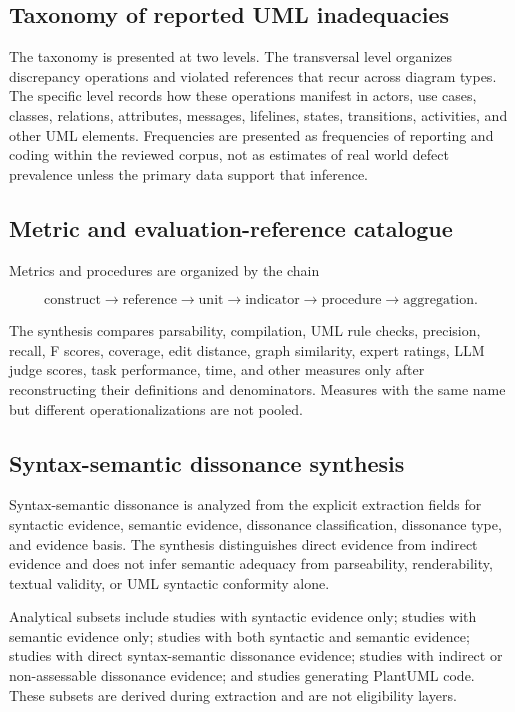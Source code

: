 \subsection{Taxonomy of reported UML inadequacies}

The taxonomy is presented at two levels. The transversal level organizes discrepancy operations and violated references that recur across diagram types. The specific level records how these operations manifest in actors, use cases, classes, relations, attributes, messages, lifelines, states, transitions, activities, and other UML elements. Frequencies are presented as frequencies of reporting and coding within the reviewed corpus, not as estimates of real world defect prevalence unless the primary data support that inference.

\subsection{Metric and evaluation-reference catalogue}

Metrics and procedures are organized by the chain

\begin{equation}
\text{construct} \rightarrow \text{reference} \rightarrow \text{unit} \rightarrow \text{indicator} \rightarrow \text{procedure} \rightarrow \text{aggregation}.
\label{eq:protocol_metrology_chain}
\end{equation}

The synthesis compares parsability, compilation, UML rule checks, precision, recall, F scores, coverage, edit distance, graph similarity, expert ratings, LLM judge scores, task performance, time, and other measures only after reconstructing their definitions and denominators. Measures with the same name but different operationalizations are not pooled.

\subsection{Syntax-semantic dissonance synthesis}

Syntax-semantic dissonance is analyzed from the explicit extraction fields for syntactic evidence, semantic evidence, dissonance classification, dissonance type, and evidence basis. The synthesis distinguishes direct evidence from indirect evidence and does not infer semantic adequacy from parseability, renderability, textual validity, or UML syntactic conformity alone.

Analytical subsets include studies with syntactic evidence only; studies with semantic evidence only; studies with both syntactic and semantic evidence; studies with direct syntax-semantic dissonance evidence; studies with indirect or non-assessable dissonance evidence; and studies generating PlantUML code. These subsets are derived during extraction and are not eligibility layers.

